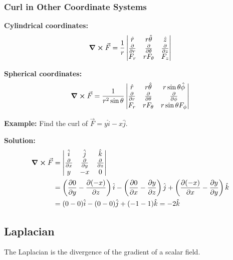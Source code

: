 \documentclass[12pt,a4paper]{article}
\begin{document}
\subsubsection{Curl in Other Coordinate Systems}
\begin{formulabox}
\textbf{Cylindrical coordinates:}
\begin{equation}
\curl \vec{F} = \frac{1}{r}\begin{vmatrix}
\hat{r} & r\hat{\theta} & \hat{z} \\
\pdv{}{r} & \pdv{}{\theta} & \pdv{}{z} \\
F_r & rF_\theta & F_z
\end{vmatrix}
\end{equation}

\textbf{Spherical coordinates:}
\begin{equation}
\curl \vec{F} = \frac{1}{r^2\sin\theta}\begin{vmatrix}
\hat{r} & r\hat{\theta} & r\sin\theta\hat{\phi} \\
\pdv{}{r} & \pdv{}{\theta} & \pdv{}{\phi} \\
F_r & rF_\theta & r\sin\theta F_\phi
\end{vmatrix}
\end{equation}
\end{formulabox}

\begin{examplebox}
\textbf{Example:} Find the curl of $\vec{F} = y\hat{i} - x\hat{j}$.

\textbf{Solution:}
\begin{align}
\curl\vec{F} &= \begin{vmatrix}
\hat{i} & \hat{j} & \hat{k} \\
\pdv{}{x} & \pdv{}{y} & \pdv{}{z} \\
y & -x & 0
\end{vmatrix} \\
&= \left(\pdv{0}{y} - \pdv{(-x)}{z}\right)\hat{i} - \left(\pdv{0}{x} - \pdv{y}{z}\right)\hat{j} + \left(\pdv{(-x)}{x} - \pdv{y}{y}\right)\hat{k} \\
&= (0 - 0)\hat{i} - (0 - 0)\hat{j} + (-1 - 1)\hat{k} = -2\hat{k}
\end{align}
\end{examplebox}

\subsection{Laplacian}
The Laplacian is the divergence of the gradient of a scalar field.
\end{document}
